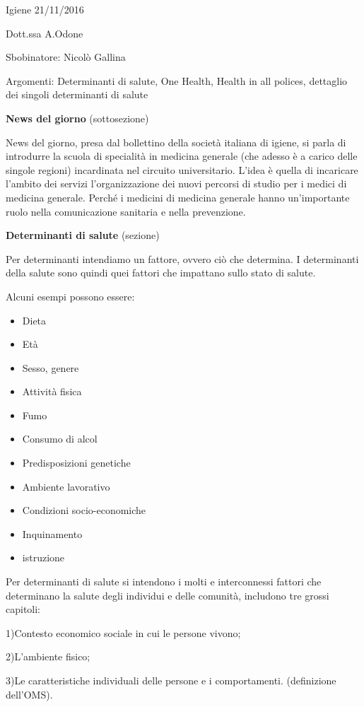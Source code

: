 \documentclass[]{article}
\date{}
\begin{document}
Igiene 21/11/2016

Dott.ssa A.Odone

Sbobinatore: Nicolò Gallina

Argomenti: Determinanti di salute, One Health, Health in all polices,
dettaglio dei singoli determinanti di salute

\textbf{News del giorno} (sottosezione)

News del giorno, presa dal bollettino della società italiana di igiene,
si parla di introdurre la scuola di specialità in medicina generale (che
adesso è a carico delle singole regioni) incardinata nel circuito
universitario. L'idea è quella di incaricare l'ambito dei servizi
l'organizzazione dei nuovi percorsi di studio per i medici di medicina
generale. Perché i medicini di medicina generale hanno un'importante
ruolo nella comunicazione sanitaria e nella prevenzione.

\textbf{Determinanti di salute} (sezione)

Per determinanti intendiamo un fattore, ovvero ciò che determina. I
determinanti della salute sono quindi quei fattori che impattano sullo
stato di salute.

Alcuni esempi possono essere:

\begin{itemize}
\item
  Dieta
\item
  Età
\item
  Sesso, genere
\item
  Attività fisica
\item
  Fumo
\item
  Consumo di alcol
\item
  Predisposizioni genetiche
\item
  Ambiente lavorativo
\item
  Condizioni socio-economiche
\item
  Inquinamento
\item
  istruzione
\end{itemize}

Per determinanti di salute si intendono i molti e interconnessi fattori
che determinano la salute degli individui e delle comunità, includono
tre grossi capitoli:

1)Contesto economico sociale in cui le persone vivono;

2)L'ambiente fisico;

3)Le caratteristiche individuali delle persone e i comportamenti.
(definizione dell'OMS).
\end{document}
